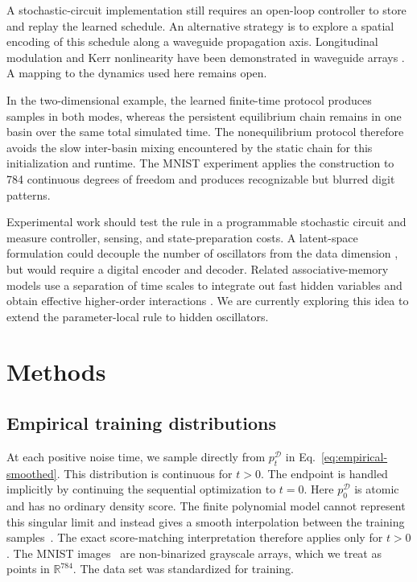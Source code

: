 \documentclass[referee,lineno,pdflatex,sn-nature]{sn-jnl}
\begin{document}
A stochastic-circuit implementation still requires an open-loop controller to store
and replay the learned schedule. An alternative strategy is to explore a spatial
encoding of this schedule along a waveguide propagation axis. Longitudinal
modulation and Kerr nonlinearity have been demonstrated in waveguide arrays
\cite{juergensen2021quantized}. A mapping to the dynamics used here remains open.

In the two-dimensional example, the learned finite-time protocol produces samples
in both modes, whereas the persistent equilibrium chain remains in one basin over
the same total simulated time. The nonequilibrium protocol therefore avoids the
slow inter-basin mixing encountered by the static chain for this initialization and
runtime.
The MNIST experiment applies the construction to 784 continuous degrees of freedom
and produces recognizable but blurred digit patterns.

Experimental work should test the rule in a programmable stochastic circuit and
measure controller, sensing, and state-preparation costs. 
A latent-space formulation could decouple the number of oscillators from the data
dimension \cite{vahdat2021score}, but would require a digital encoder and decoder.
Related associative-memory models use a separation of time scales to integrate out
fast hidden variables and obtain effective higher-order interactions
\cite{krotov2020large}. We are currently exploring this idea to extend the parameter-local rule to hidden oscillators. 

\section{Methods}\label{sec:methods}

\subsection{Empirical training distributions}

At each positive noise time, we sample directly from
$p_t^{\mathcal D}$ in Eq.~\eqref{eq:empirical-smoothed}. This distribution is
continuous for $t>0$.
The endpoint is handled implicitly by continuing the sequential optimization to
$t=0$. Here $p_0^{\mathcal D}$ is atomic and has no ordinary density score. The
finite polynomial model cannot represent this singular limit and instead gives a
smooth interpolation between the training samples~\cite{kamb2024analytic}. The exact score-matching
interpretation therefore applies only for $t>0$.
The MNIST images~\cite{lecun1998gradient} are non-binarized grayscale arrays, which we treat as points in
$\mathbb R^{784}$. 
The data set was standardized for training.
\end{document}
